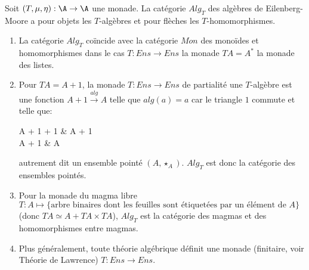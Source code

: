 \documentclass[math, info]{cours}
\begin{document}
\begin{definition}
	Soit $(T, \mu, \eta): \A \to \A$ une monade. La catégorie $Alg_{T}$ des algèbres de Eilenberg-Moore a pour objets les $T$-algèbres et pour flèches les $T$-homomorphismes.
	\label{def:algT}
\end{definition}
\begin{exemple}
	\begin{enumerate}
		\item La catégorie $Alg_{T}$ coïncide avec la catégorie $Mon$ des monoïdes et homomorphismes dans le cas $T: Ens \to Ens$ la monade $TA = A^{*}$ la monade des listes.
		\item Pour $TA = A + 1$, la monade $T: Ens \to Ens$ de partialité une $T$-algèbre est une fonction $A+ 1 \xrightarrow{alg} A$ telle que $alg(a) = a$ car le triangle $1$ commute et telle que:
			\begin{category}
				A + 1 + 1 \ar[r, "\mu_{A}"]\ar[d, "alg + 1"'] & A + 1\ar[d, "alg"]\\
				A + 1 \ar[r, "alg"'] & A
			\end{category}
			autrement dit un ensemble pointé $(A, \star_{A})$. $Alg_{T}$ est donc la catégorie des ensembles pointés.
		\item Pour la monade du magma libre $T: A \mapsto \{\text{arbre binaires dont les feuilles sont étiquetées par un élément de } A\}$ (donc $TA \simeq A + TA\times TA$), $Alg_{T}$ est la catégorie des magmas et des homomorphismes entre magmas.
		\item Plus généralement, toute théorie algébrique définit une monade (finitaire, voir Théorie de Lawrence) $T: Ens \to Ens$.
	\end{enumerate}
\end{exemple}
\end{document}
